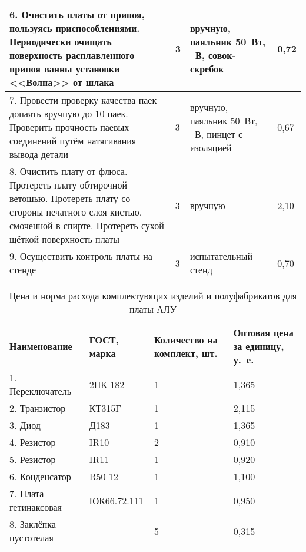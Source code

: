 \begin{table} [h!]
{\begin{tabular}{| m{10cm} | m{0.4cm} | m{3cm} | m{1.3cm} |}
      6. Очистить платы от припоя, пользуясь приспособлениями. Периодически очищать
      поверхность расплавленного припоя ванны установки <<Волна>> от шлака &
      3 & вручную, паяльник 50~Вт, \newline 36~В, совок-скребок & 0,72 \\ \hline

      7. Провести проверку качества паек допаять вручную до 10 паек. Проверить
      прочность паевых соединений путём натягивания вывода детали &
      3 & вручную, паяльник 50~Вт, \newline 36~В, пинцет с изоляцией & 0,67 \\ \hline

      8. Очистить плату от флюса. Протереть плату обтирочной ветошью. Протереть
      плату со стороны печатного слоя кистью, смоченной в спирте. Протереть
      сухой щёткой поверхность платы &
      3 & вручную & 2,10 \\ \hline

      9. Осуществить контроль платы на стенде &
      3 & испытательный стенд & 0,70 \\ \hline

    \end{tabular}
  }
\end{table}

\newpage

\begin{table} [h!]
  \caption{
    Цена и норма расхода комплектующих изделий и полуфабрикатов для платы АЛУ
  }\label{tbl:components_consumption}
  {\small
    \begin{tabular}{| m{4.8cm} | m{3.1cm} | m{3.2cm} | m{3.2cm} |}
      \hline
      Наименование & ГОСТ, марка & Количество на комплект, шт. &
      Оптовая цена за единицу, у.~е. \\ \hline

      1. Переключатель       & 2ПК-182     & 1 & 1,365 \\ \hline
      2. Транзистор          & КТ315Г      & 1 & 2,115 \\ \hline
      3. Диод                & Д183        & 1 & 1,365 \\ \hline
      4. Резистор            & IR10        & 2 & 0,910 \\ \hline
      5. Резистор            & IR11        & 1 & 0,920 \\ \hline
      6. Конденсатор         & R50-12      & 1 & 1,100 \\ \hline
      7. Плата гетинаксовая  & ЮК66.72.111 & 1 & 0,950 \\ \hline
      8. Заклёпка пустотелая & -           & 5 & 0,315 \\ \hline

    \end{tabular}
  }
\end{table}

